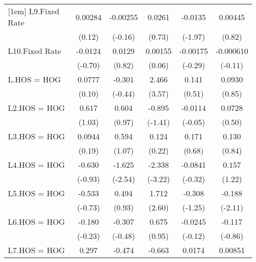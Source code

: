 {\begin{longtable}{l*{5}{c}}
[1em]
L9.Fixed Rate   &  0.00284         & -0.00255         &   0.0261         &  -0.0135         &  0.00445         \\
                &   (0.12)         &  (-0.16)         &   (0.73)         &  (-1.97)         &   (0.82)         \\
[1em]
L10.Fixed Rate  &  -0.0124         &   0.0129         &  0.00155         & -0.00175         &-0.000610         \\
                &  (-0.70)         &   (0.82)         &   (0.06)         &  (-0.29)         &  (-0.11)         \\
[1em]
L.HOS = HOG     &   0.0777         &   -0.301         &    2.466\sym{***}&    0.141         &   0.0930         \\
                &   (0.10)         &  (-0.44)         &   (3.57)         &   (0.51)         &   (0.85)         \\
[1em]
L2.HOS = HOG    &    0.617         &    0.604         &   -0.895         &  -0.0114         &   0.0728         \\
                &   (1.03)         &   (0.97)         &  (-1.41)         &  (-0.05)         &   (0.50)         \\
[1em]
L3.HOS = HOG    &   0.0944         &    0.594         &    0.124         &    0.171         &    0.130         \\
                &   (0.19)         &   (1.07)         &   (0.22)         &   (0.68)         &   (0.84)         \\
[1em]
L4.HOS = HOG    &   -0.630         &   -1.625\sym{*}  &   -2.338\sym{**} &  -0.0841         &    0.157         \\
                &  (-0.93)         &  (-2.54)         &  (-3.22)         &  (-0.32)         &   (1.22)         \\
[1em]
L5.HOS = HOG    &   -0.533         &    0.494         &    1.712\sym{*}  &   -0.308         &   -0.188\sym{*}  \\
                &  (-0.73)         &   (0.93)         &   (2.60)         &  (-1.25)         &  (-2.11)         \\
[1em]
L6.HOS = HOG    &   -0.180         &   -0.307         &    0.675         &  -0.0245         &   -0.117         \\
                &  (-0.23)         &  (-0.48)         &   (0.95)         &  (-0.12)         &  (-0.86)         \\
[1em]
L7.HOS = HOG    &    0.297         &   -0.474         &   -0.663         &   0.0174         &  0.00851         \\

\end{longtable}}
